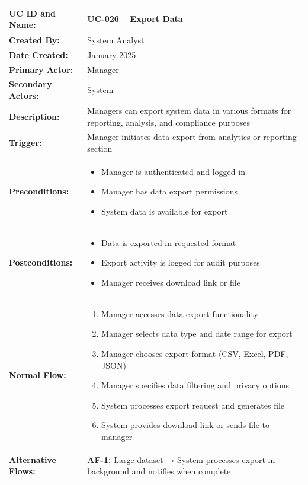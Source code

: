 \documentclass[12pt,a4paper]{article}
\begin{document}
\renewcommand{\arraystretch}{1.5}
\begin{longtable}{|p{4.5cm}|p{10.5cm}|}
\hline
\textbf{UC ID and Name:} & UC-026 – Export Data \\
\hline
\textbf{Created By:} & System Analyst \\
\hline
\textbf{Date Created:} & January 2025 \\
\hline
\textbf{Primary Actor:} & Manager \\
\hline
\textbf{Secondary Actors:} & System \\
\hline
\textbf{Description:} & Managers can export system data in various formats for reporting, analysis, and compliance purposes \\
\hline
\textbf{Trigger:} & Manager initiates data export from analytics or reporting section \\
\hline
\textbf{Preconditions:} &
\begin{itemize}
  \item Manager is authenticated and logged in
  \item Manager has data export permissions
  \item System data is available for export
\end{itemize} \\
\hline
\textbf{Postconditions:} &
\begin{itemize}
  \item Data is exported in requested format
  \item Export activity is logged for audit purposes
  \item Manager receives download link or file
\end{itemize} \\
\hline
\textbf{Normal Flow:} &
\begin{enumerate}
  \item Manager accesses data export functionality
  \item Manager selects data type and date range for export
  \item Manager chooses export format (CSV, Excel, PDF, JSON)
  \item Manager specifies data filtering and privacy options
  \item System processes export request and generates file
  \item System provides download link or sends file to manager
\end{enumerate} \\
\hline
\textbf{Alternative Flows:} &
\textbf{AF-1:} Large dataset → System processes export in background and notifies when complete \\

\end{longtable}
\end{document}

